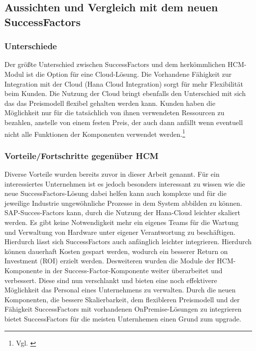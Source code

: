 \subsection{Aussichten und Vergleich mit dem neuen SuccessFactors}
\subsubsection{Unterschiede}
Der größte Unterschied zwischen SuccessFactors und dem herkömmlichen HCM-Modul ist die Option für eine Cloud-Lösung. Die Vorhandene Fähigkeit zur Integration mit der Cloud (Hana Cloud Integration) sorgt für mehr Flexibilität beim Kunden. Die Nutzung der Cloud bringt ebenfalls den Unterschied mit sich das das Preismodell flexibel gehalten werden kann. Kunden haben die Möglichkeit nur für die tatsächlich von ihnen verwendeten Ressourcen zu bezahlen, anstelle von einem festen Preis, der auch dann anfällt wenn eventuell nicht alle Funktionen der Komponenten verwendet werden.\footnote{Vgl. \cite{SAPSE2024i}}

\subsubsection{Vorteile/Fortschritte gegenüber HCM}
Diverse Vorteile wurden bereits zuvor in dieser Arbeit genannt. Für ein interessiertes Unternehmen ist es jedoch besonders interessant zu wissen wie die neue SuccessFactors-Lösung dabei helfen kann auch komplexe und für die jeweilige Industrie ungewöhnliche Prozesse in dem System abbilden zu können. SAP-Succes-Factors kann, durch die Nutzung der Hana-Cloud leichter skaliert werden. Es gibt keine Notwendigkeit mehr ein eigenes Teams für die Wartung und Verwaltung von Hardware unter eigener Verantwortung zu beschäftigen. Hierdurch lässt sich SuccessFactors auch anfänglich leichter integrieren. Hierdurch können dauerhaft Kosten gespart werden, wodurch ein besserer Return on Investment (ROI) erzielt werden. Desweiteren wurden die Module der HCM-Komponente in der Success-Factor-Komponente weiter überarbeitet und verbessert. Diese sind nun verschlankt und bieten eine noch effektivere Möglichkeit das Personal eines Unternehmens zu verwalten. Durch die neuen Komponenten, die bessere Skalierbarkeit, dem flexibleren Preismodell und der Fähigkeit SuccessFactors mit vorhandenen OnPremise-Lösungen zu integrieren bietet SuccessFactors für die meisten Unternhemen einen Grund zum upgrade. 